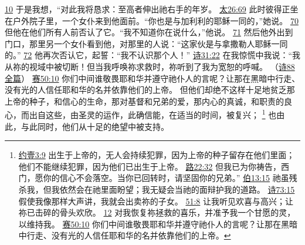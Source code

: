 \documentclass[12pt, a4paper, oneside]{ctexart}
\begin{document}
{		\href{https://biblehub.com/psalms/77-10.htm}{10} 于是我想，“对此我将恳求：至高者伸出祂右手的年岁。
		\href{https://biblehub.com/matthew/26-69.htm}{太26:69} 此时彼得正坐在户外院子里，一个女仆来到他面前。“你也是与加利利的耶稣一同的，”她说。
		\href{https://biblehub.com/matthew/26-70.htm}{70} 但他在他们所有人前否认了它。“我不知道你在说什么，”他说。
		\href{https://biblehub.com/matthew/26-71.htm}{71} 然后他外出到门口，那里另一个女仆看到他，对那里的人说：“这家伙是与拿撒勒人耶稣一同的。”
		\href{https://biblehub.com/matthew/26-72.htm}{72} 他再次否认它，起誓：“我不认识那个人！”
		\href{https://biblehub.com/psalms/31-22.htm}{诗31:22} 在我惊慌中我说：“我从祢的视域中被切断！但当我呼唤祢求救时，祢听到了我为宽恕的呼喊。
		（\href{https://biblehub.com/niv/psalms/88.htm}{诗88全篇}）
		\href{https://biblehub.com/isaiah/50-10.htm}{赛50:10} 你们中间谁敬畏耶和华并遵守祂仆人的言呢？让那在黑暗中行走、没有光的人信任耶和华的名并依靠他们的上帝。
	}
	但他们却绝不这样十足地贫乏那上帝的种子，和信心的生命，那对基督和兄弟的爱，那内心的真诚，和职责的良心，而出自这些，由圣灵的运作，此确信能，在适当的时间，被复兴；
	\footnote {
		\href{https://biblehub.com/1_john/3-9.htm}{约壹3:9} 出生于上帝的，无人会持续犯罪，因为上帝的种子留存在他们里面；他们不能继续犯罪，因为他们已出生于上帝。
		\href{https://biblehub.com/luke/22-32.htm}{路22:32} 但我已为你祷告，西门，愿你的信心不会落空。当你已回转时，请坚固你的兄弟。”
		\href{https://biblehub.com/job/13-15.htm}{伯13:15} 祂虽残杀我，但我依然会在祂里面盼望；我无疑会当祂的面辩护我的道路。
		\href{https://biblehub.com/psalms/73-15.htm}{诗73:15} 假使我像那样大声讲，我就会出卖祢的子女。
		\href{https://biblehub.com/psalms/51-8.htm}{51:8} 让我听见欢喜与高兴；让祢已击碎的骨头欢欣。
		\href{https://biblehub.com/psalms/51-12.htm}{12} 对我恢复祢拯救的喜乐，并准予我一个甘愿的灵，以维持我。
        \href{https://biblehub.com/isaiah/50-10.htm}{赛50:10} 你们中间谁敬畏耶和华并遵守祂仆人的言呢？让那在黑暗中行走、没有光的人信任耶和华的名并依靠他们的上帝。
	}
	也由此，与此同时，他们从十足的绝望中被支持。
\end{document}
